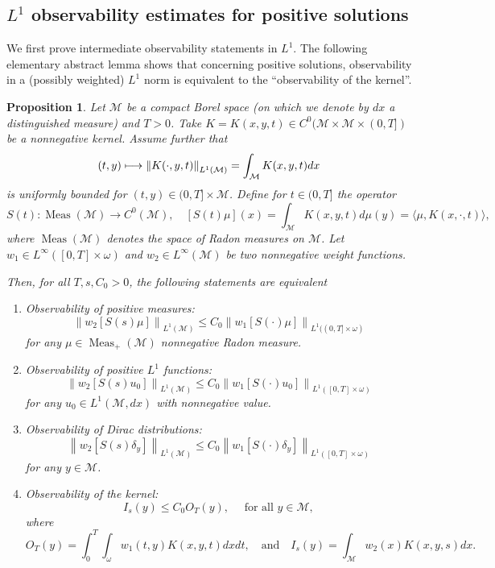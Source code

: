 \documentclass[10pt]{amsart}
\newcommand\mto{\mathchoice{\longmapsto}{\mapsto}{\mapsto}{\mapsto}}
\newtheorem{proposition}[lemma]{Proposition}
\theoremstyle{definition}
\newcommand{\M}{\ensuremath{\mathcal M}}
\DeclareMathOperator{\Meas}{Meas}
\newcommand\nor[2]{\left\|#1\right\|_{#2}}
\begin{document}
\subsection{$L^1$ observability estimates for positive solutions}
\label{s:L1obs}
We first prove intermediate observability statements in $L^1$.
The following elementary abstract lemma shows that concerning positive solutions, observability in a (possibly weighted) $L^1$ norm is equivalent to the ``observability of the kernel''.
\begin{proposition}
\label{propequivobsKernel}
Let $\M$ be a compact Borel space (on which we denote by $dx$ a distinguished measure) and $T>0$. Take $K =K(x,y,t) \in C^0( \M \times \M\times(0,T] )$ be a nonnegative kernel. Assume further that
\[
(t,y) \mto \nor{K(\cdot,y,t)}{L^1(\M)} = \int_\M K(x,y,t) dx
\]
is uniformly bounded for $(t,y)\in (0,T] \times \M$.
Define for $t\in (0,T]$ the operator
\[
S(t) : \Meas(\M) \to C^0(\M), \quad
\left[S(t)\mu \right](x)=\int_{\M} K(x,y,t)d\mu(y) = \langle \mu, K(x,\cdot,t) \rangle,
\]
where $\Meas(\M)$ denotes the space of Radon measures on $\M$.
Let $w_1\in L^{\infty}([0,T]\times \omega)$ and $w_2\in L^{\infty}(\M)$ be two nonnegative weight functions.

Then, for all $T, s,C_0>0$, the following statements are equivalent
\begin{enumerate}
\item \label{enumObsmeasure}Observability of positive measures:
\begin{equation}
\label{e:meas-mu-obs}
\nor{w_2 \left[S(s)\mu\right]}{L^1(\M)}\leq C_0 \nor{w_1 [S(\cdot)\mu]}{L^1((0,T]\times\omega)}
\end{equation}
for any $\mu \in \Meas_+(\M)$ nonnegative Radon measure.
\item \label{enumObsL1} Observability of positive $L^1$ functions:
\[
\nor{w_2 \left[S(s)u_0\right]}{L^1(\M)}\leq C_0 \nor{w_1\left[S(\cdot)u_0\right]}{L^1([0,T]\times \omega)}
\]
for any $u_0\in L^1(\M, dx)$ with nonnegative value.
\item \label{enumObsDirac}Observability of Dirac distributions:
\[
\nor{w_2 \left[S(s) \delta_y \right]}{L^1(\M)}\leq C_0 \nor{w_1 \left[S(\cdot) \delta_y \right]}{L^1([0,T]\times \omega)}
\]
for any $y\in \M$.
\item \label{enumObsKernel}Observability of the kernel:
\[
I_s (y)\leq C_0 O_T(y), \quad \text{ for all } y \in \M,
\]
where
\[
O_T(y)=\int_0^T \int_{\omega} w_1(t,y)K(x,y,t)dx dt, \quad \text{and} \quad
I_s (y)=\int_{\M} w_2(x)K(x,y,s)dx.
\]
\end{enumerate}
\end{proposition}
\end{document}
